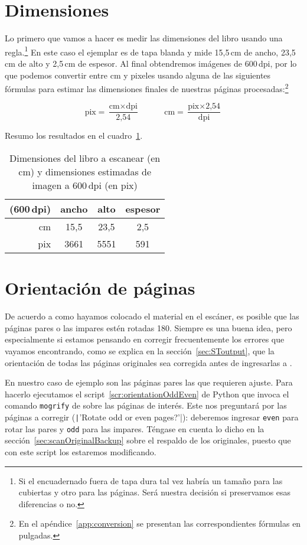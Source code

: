 \documentclass[%
	a5paper,
	10pt,
	twoside,
	openright,
	final,
]{memoir}
\begin{document}
{	\section{Dimensiones\label{sec:cleanAdjustDimensions}} Lo primero que vamos a hacer es medir las dimensiones del libro usando una regla.\footnote{Si el encuadernado fuera de tapa dura tal vez habría un tamaño para las cubiertas y otro para las páginas. Será nuestra decisión si preservamos esas diferencias o no.} En este caso el ejemplar es de tapa blanda y mide 15,5\,cm de ancho, 23,5\,cm de alto y 2,5\,cm de espesor. Al final obtendremos imágenes de 600\,dpi, por lo que podemos convertir entre cm y pixeles usando alguna de las siguientes fórmulas para estimar las dimensiones finales de nuestras páginas procesadas:\footnote{En el apéndice~\ref{app:conversion} se presentan las correspondientes fórmulas en pulgadas.}

	\[
		\text{pix} = \frac{\text{cm} \times \text{dpi}}{\text{2,54}}\hspace{3em} \text{cm} = \frac{\text{pix} \times \text{2,54}}{\text{dpi}}
	\]

	Resumo los resultados en el cuadro~\ref{tab:bookDimensions}.
	\begin{table}
		\centering
		\caption{Dimensiones del libro a escanear (en cm) y dimensiones estimadas de imagen a 600\,dpi (en pix)\label{tab:bookDimensions}}
		\begin{tabular}{rccc}
			\toprule
			(600\,dpi) & ancho & alto & espesor \\
			\midrule
			cm  & 15,5 & 23,5 & 2,5 \\
			pix & 3661 & 5551 & 591 \\
			\bottomrule
		\end{tabular}
	\end{table}

	\section{Orientación de páginas\label{sec:fixOrientation}} De acuerdo a como hayamos colocado el material en el escáner, es posible que las páginas pares o las impares estén rotadas 180\textdegree. Siempre es una buena idea, pero especialmente si estamos pensando en corregir frecuentemente los errores que vayamos encontrando, como se explica en la sección~\ref{sec:SToutput}, que la orientación de todas las páginas originales sea corregida antes de ingresarlas a \scantailor.

	En nuestro caso de ejemplo son las páginas pares las que requieren ajuste. Para hacerlo ejecutamos el script~\ref{scr:orientationOddEven} de Python que invoca el comando \texttt{mogrify} de \imagemagick sobre las páginas de interés. Este nos preguntará por las páginas a corregir (\texttt|'Rotate odd or even pages?'|): deberemos ingresar \texttt{even} para rotar las pares y \texttt{odd} para las impares. Téngase en cuenta lo dicho en la sección~\ref{sec:scanOriginalBackup} sobre el respaldo de los originales, puesto que con este script los estaremos modificando.

}
\end{document}
